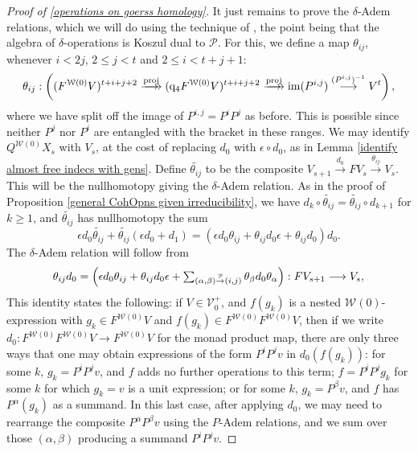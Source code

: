 \documentclass[11pt]{amsart} \renewcommand{\baselinestretch}{1.2}
\theoremstyle{plain}
\theoremstyle{definition}
\DeclareMathOperator{\im}{im}
\renewcommand{\to}{\longrightarrow}
\newcommand{\calP}{\mathcal{P}}
\newcommand{\calV}{\mathcal{V}}
\newcommand{\calw}{\mathcal{W}}
\newcommand{\Palg}{{\calP}}
\newcommand{\vect}[2]{\calV^{#1}_{#2}}
\newcommand{\quadgrad}[1]{\mathrm{q}_{#1}}
\newcommand{\produces}[3]{#3:#1\sim #2}
\renewcommand{\produces}[3]{#1\rightarrow_{#3} #2}%
\renewcommand{\produces}[3]{#1\overset{\smash{#3}}{\rightarrow} #2}%
\begin{document}
\begin{Cohomology Operations for W and U}
\begin{proof}[Proof of \ref{operations on goerss homology}]
It just remains to prove the $\delta$-Adem relations, which we will do using the technique of \cite{PriddyKoszul.pdf}, the point being that the algebra of $\delta$-operations is Koszul dual to $\Palg$. For this, we define a map $\theta_{ij}$, whenever $i<2j$, $2\leq j<t$ and $2\leq i<t+j+1$:
\[\theta_{ij}:\left((F^{\calw(0)}V)^{t+i+j+2}\overset{\textup{proj}}{\makebox[.06ex][l]{$\to$}\to} (\quadgrad{4}F^{\calw(0)}V)^{t+i+j+2}\overset{\textup{proj}}{\makebox[.06ex][l]{$\to$}\to} \im (P^{i,j})\overset{(P^{i,j})^{-1}}{\to}V^{t}\right),\]
where we have split off the image of 
$P^{i,j}=P^iP^j$ %
as before. This is possible since neither $P^j$ nor $P^i$ are entangled with the bracket in these ranges. We may identify $Q^{\calw(0)}X_s$ with $V_s$, at the cost of replacing $d_0$ with $\epsilon\circ d_0$, as in Lemma \ref{identify almost free indecs with gens}.  Define $\widetilde{\theta_{ij}}$ to be the composite $V_{s+1}\overset{d_0}{\to}FV_s\overset{\theta_{ij}}{\to}V_s$. This will be the nullhomotopy giving the $\delta$-Adem relation. %
As in the proof of Proposition \ref{general CohOpns given irreducibility}, we have $d_k\circ\widetilde{\theta_{ij}}=\widetilde{\theta_{ij}}\circ d_{k+1}$ for $k\geq1$, and $\widetilde{\theta_{ij}}$ has nullhomotopy the sum
\[\epsilon d_0\widetilde{\theta_{ij}}+\widetilde{\theta_{ij}}(\epsilon d_0+d_1)=(\epsilon d_0\theta_{ij}+\theta_{ij}d_0\epsilon+\theta_{ij}d_0)d_0.\]
The $\delta$-Adem relation will follow from
\[\textstyle\theta_{ij}d_0=\Bigl(\epsilon d_0\theta_{ij}+\theta_{ij}d_0\epsilon+\sum_{\produces{(\alpha,\beta)}{(i,j)}{\Palg}}\theta_\beta d_0\theta_\alpha\Bigr):FV_{s+1}\to V_s,\]
This identity states the following: if $V\in\vect{+}{0}$, and $f(g_k)$ is a nested $\calw(0)$-expression with $g_k\in F^{\calw(0)}V$ and $f(g_k)\in F^{\calw(0)}F^{\calw(0)}V$, then if we write $d_0:F^{\calw(0)}F^{\calw(0)}V\to F^{\calw(0)}V$ for the monad product map, there are only three ways that one may obtain expressions of the form $P^iP^jv$ in $d_0(f(g_k))$: for some $k$, $g_k=P^iP^jv$, and $f $ adds no further operations to this term; $f=P^iP^jg_{k}$ for some $k$ for which $g_{k}=v$ is a unit expression; or for some $k$, $g_k=P^\beta v$, and  $f$ has $P^\alpha(g_k)$ as a summand. In this last case, after applying $d_0$, we may need to rearrange the composite $P^{\alpha}P^{\beta}v$ using the $P$-Adem relations, and we sum over those $(\alpha,\beta)$ producing a summand $P^iP^jv$.


\end{proof}
\end{Cohomology Operations for W and U}
\end{document}
